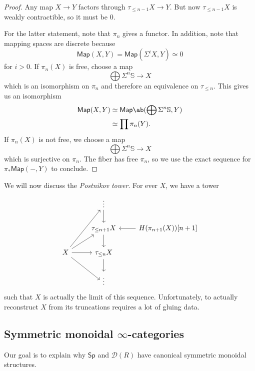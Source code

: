 \documentclass[10pt, oneside]{memoir}
\theoremstyle{definition}
\theoremstyle{remark}
\theoremstyle{plain}
\theoremstyle{definition}
\theoremstyle{remark}
\newcommand{\bS}{\mathbb{S}}
\newcommand{\mc}[1]{\mathcal{#1}}
\newcommand{\ms}[1]{\mathsf{#1}}
\newcommand{\1}{\mathbf{1}}
\newcommand{\2}{\mathbf{2}}
\newcommand{\3}{\mathbf{3}}
\begin{document}
\begin{proof}
    Any map $X \to Y$ factors through $\tau_{\leq n-1} X \to Y$. But now $\tau_{\leq n-1} X$ is weakly contractible, so it must be $0$.

    For the latter statement, note that $\pi_n$ gives a functor. In addition, note that mapping spaces are discrete because
    \[ \ms{Map}(X, Y) = \ms{Map}(\Sigma^i X, Y) \simeq 0 \]
    for $i > 0$. If $\pi_n(X)$ is free, choose a map
    \[ \bigoplus \Sigma^n \bS \to X \]
    which is an isomorphism on $\pi_n$ and therefore an equivalence on $\tau_{\leq n}$. This gives us an isomorphism
    \begin{align*}
        \ms{Map}(X, Y) &\simeq \ms{Map} \ab(\bigoplus \Sigma^n \bS, Y) \\
        &\simeq \prod \pi_n(Y).
    \end{align*}
    If $\pi_n(X)$ is not free, we choose a map
    \[ \bigoplus \Sigma^n \bS \to X \]
    which is surjective on $\pi_n$. The fiber has free $\pi_n$, so we use the exact sequence for $\pi_* \ms{Map}(-, Y)$ to conclude.
\end{proof}

We will now discuss the \textit{Postnikov tower}. For ever $X$, we have a tower
\begin{equation*}
\begin{tikzcd}
    & \vdots \ar{d} \\
    & \tau_{\leq n+1} X \ar{d} & H(\pi_{n+1}(X))[n+1] \ar{l} \\
    X \ar{uur} \ar{ur} \ar{r} \ar{dr} & \tau_{\leq n} X \ar{d} \\
    & \vdots
\end{tikzcd}
\end{equation*}
such that $X$ is actually the limit of this sequence. Unfortunately, to actually reconstruct $X$ from its truncations requires a lot of gluing data.


\subsection{\texorpdfstring{Symmetric monoidal $\infty$-categories}{Symmetric monoidal infinity-categories}}%
\label{sub:Symmetric monoidal infinity-categories}

Our goal is to explain why $\ms{Sp}$ and $\mc{D}(R)$ have canonical symmetric monoidal structures.
\end{document}

